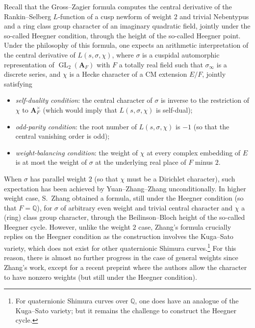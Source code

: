 \documentclass[12pt]{amsart}
\numberwithin{equation}{section}
\theoremstyle{plain}
\theoremstyle{definition}
\theoremstyle{remark}
\renewcommand{\b}[1]{\mathbf{#1}}
\renewcommand{\d}[1]{\mathbb{#1}}
\renewcommand{\(}{\left(}
\renewcommand{\)}{\right)}
\newcommand{\bA}{\b A}
\newcommand{\dQ}{\d Q}
\DeclareMathOperator{\GL}{GL}
\begin{document}
Recall that the Gross--Zagier formula \cite{GZ86} computes the central derivative of the Rankin--Selberg $L$-function of a cusp newform of weight $2$ and trivial Nebentypus and a ring class group character of an imaginary quadratic field, jointly under the so-called Heegner condition, through the height of the so-called Heegner point. Under the philosophy of this formula, one expects an arithmetic interpretation of the central derivative of $L(s,\sigma,\chi)$, where $\sigma$ is a cuspidal automorphic representation of $\GL_2(\bA_F)$ with $F$ a totally real field such that $\sigma_\infty$ is a discrete series, and $\chi$ is a Hecke character of a CM extension $E/F$, jointly satisfying
\begin{itemize}
  \item \emph{self-duality condition}: the central character of $\sigma$ is inverse to the restriction of $\chi$ to $\bA_F^\times$ (which would imply that $L(s,\sigma,\chi)$ is self-dual);

  \item \emph{odd-parity condition}: the root number of $L(s,\sigma,\chi)$ is $-1$ (so that the central vanishing order is odd);

  \item \emph{weight-balancing condition}: the weight of $\chi$ at every complex embedding of $E$ is at most the weight of $\sigma$ at the underlying real place of $F$ minus $2$.
\end{itemize}

When $\sigma$ has parallel weight $2$ (so that $\chi$ must be a Dirichlet character), such expectation has been achieved by Yuan--Zhang--Zhang \cite{YZZ13} unconditionally. In higher weight case, S.~Zhang \cite{Zha97} obtained a formula, still under the Heegner condition (so that $F=\dQ$), for $\sigma$ of arbitrary even weight and trivial central character and $\chi$ a (ring) class group character, through the Beilinson--Bloch height of the so-called Heegner cycle. However, unlike the weight $2$ case, Zhang's formula crucially replies on the Heegner condition as the construction involves the Kuga--Sato variety, which does not exist for other quaternionic Shimura curves.\footnote{For quaternionic Shimura curves over $\dQ$, one does have an analogue of the Kuga--Sato variety; but it remains the challenge to construct the Heegner cycle.} For this reason, there is almost no further progress in the case of general weights since Zhang's work, except for a recent preprint \cite{LS} where the authors allow the character to have nonzero weights (but still under the Heegner condition).
\end{document}
